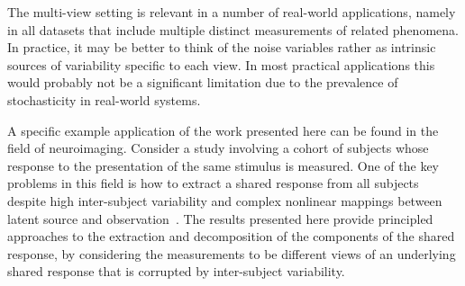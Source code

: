 %




The multi-view setting is relevant in a number of real-world applications, namely in all datasets that include multiple distinct measurements of related phenomena.
In practice, it may be better to think of the noise variables rather as intrinsic sources of variability specific to each view.
In most practical applications this would probably not be a significant limitation due to the prevalence of stochasticity in real-world systems.

A specific example application of the work presented here can be found in the field of neuroimaging.
Consider a study involving a cohort of subjects whose response to the presentation of the same stimulus is measured.
One of the key problems in this field is how to extract a shared response from all subjects despite high inter-subject variability and complex nonlinear mappings between latent source and observation~\citep{haxby2011common, chen2015reduced}.
The results presented here provide principled approaches to the extraction and decomposition of the components of the shared response, by considering the measurements to be different views of an underlying shared response that is corrupted by inter-subject variability.



